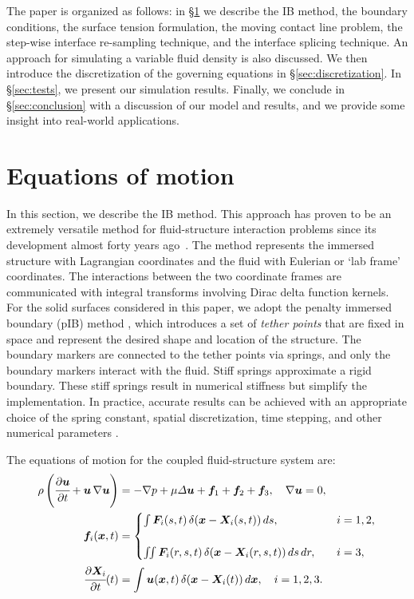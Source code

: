 \documentclass{jfm}
\begin{document}
The paper is organized as follows: in \S\ref{sec:numerical} we describe the IB method, the boundary conditions, the surface tension formulation, the moving contact line problem, the step-wise interface re-sampling technique, and the interface splicing technique. An approach for simulating a variable fluid density is also discussed. We then introduce the discretization of the governing equations in \S\ref{sec:discretization}. In \S\ref{sec:tests}, we present our simulation results. Finally, we conclude in \S\ref{sec:conclusion} with a discussion of our model and results, and we provide some insight into real-world applications.

\section{Equations of motion} \label{sec:numerical}
In this section, we describe the IB method. This approach has proven to be an extremely versatile method for fluid-structure interaction problems since its development almost forty years ago~\citep{peskin1972flow,mcqueen1997shared,arthurs1998modelling,lai2000immersed,griffith2009simulating,balboa2011staggered,devendran2012immersed,sanaei2021flight}. The method represents the immersed structure with Lagrangian coordinates and the fluid with Eulerian or `lab frame' coordinates. The interactions between the two coordinate frames are communicated with integral transforms involving Dirac delta function kernels. For the solid surfaces considered in this paper, we adopt the penalty immersed boundary (pIB) method \citep{kim2016penalty}, which introduces a set of \textit{tether points} that are fixed in space and represent the desired shape and location of the structure. The boundary markers are connected to the tether points via springs, and only the boundary markers interact with the fluid. Stiff springs approximate a rigid boundary. These stiff springs result in numerical stiffness but simplify the implementation. In practice, accurate results can be achieved with an appropriate choice of the spring constant, spatial discretization, time stepping, and other numerical parameters \citep{kim2016penalty}. 

The equations of motion for the coupled fluid-structure system are:
\begin{align}
\rho\left(\cfrac{\partial\bm{u}}{\partial t}+\bm{u}\,\nabla\bm{u}\right) & =
    -\nabla p+\mu\varDelta\bm{u}+\bm{f}_1+\bm{f}_2+\bm{f}_3,
    \quad
    \nabla \bm{u}=0, \label{eq:ib-ns} \\
\bm{f}_i(\bm{x},t) & = 
    \begin{cases}
    \int  \bm{F}_i(   s,t)\,\delta(\bm{x}-\bm{X}_i(   s,t))\,ds,     \quad &i = 1,2, \\ \\
    \iint \bm{F}_i(r, s,t)\,\delta(\bm{x}-\bm{X}_i(r, s,t))\,ds\,dr, \quad &i = 3, 
    \end{cases}
    \label{eq:ib-spread-force} \\
\cfrac{\partial\bm{X}_i}{\partial t}(t) &=
    \int\bm{u}(\bm{x},t)\,\delta(\bm{x}-\bm{X}_i(t)) \, d\bm{x}, \quad i = 1,2,3.
    \label{eq:ib-advect}
\end{align}
\end{document}
